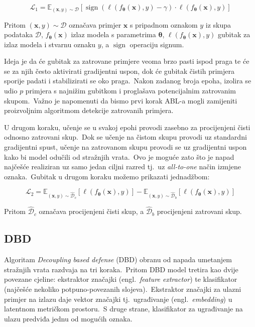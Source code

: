 \documentclass[diplomskirad]{fer}
\begin{document}
\begin{equation}
  \mathcal{L}_1 = \mathbb{E}_{(\bm{x}, y) \sim \mathcal{D}} \left[ \operatorname{sign} \left( \ell(f_{\bm{\theta}}(\bm{x}), y) - \gamma \right) \cdot \ell(f_{\bm{\theta}}(\bm{x}), y) \right]
  \label{eq:abl1}
\end{equation}

Pritom $(\bm{x}, y) \sim \mathcal{D}$ označava primjer $\bm{x}$ s pripadnom oznakom $y$ iz skupa podataka $\mathcal{D}$, $f_{\bm{\theta}}(\bm{x})$ izlaz modela s parametrima $\bm{\theta}$, $\ell(f_{\bm{\theta}}(\bm{x}), y)$ gubitak za izlaz modela i stvarnu oznaku $y$, a $\operatorname{sign}$ operaciju signum.\ 
  
Ideja je da će gubitak za zatrovane primjere veoma brzo pasti ispod praga te će se za njih često aktivirati gradijentni uspon, dok će gubitak čistih primjera sporije padati i stabilizirati se oko praga.\ 
Nakon zadanog broja epoha, izolira se udio $p$ primjera s najnižim gubitkom i proglašava potencijalnim zatrovanim skupom.\ Važno je napomenuti da bismo prvi korak ABL-a mogli zamijeniti proizvoljnim algoritmom detekcije zatrovanih primjera.\ 
  
U drugom koraku, učenje se u svakoj epohi provodi zasebno za procijenjeni čisti odnosno zatrovani skup.\ 
Dok se učenje na čistom skupu provodi uz standardni gradijentni spust, učenje na zatrovanom skupu provodi se uz gradijentni uspon kako bi model odučili od stražnjih vrata.\ 
Ovo je moguće zato što je napad najčešće realiziran uz samo jedan ciljni razred tj.\ uz \textit{all-to-one} način izmjene oznaka.\ Gubitak u drugom koraku možemo prikazati jednadžbom:

\begin{equation}
  \mathcal{L}_2 = \mathbb{E}_{(\bm{x}, y) \sim \hat{\mathcal{D}}_c} \left[ \ell(f_{\bm{\theta}}(\bm{x}), y) \right] - \mathbb{E}_{(\bm{x}, y) \sim \hat{\mathcal{D}}_b} \left[ \ell(f_{\bm{\theta}}(\bm{x}), y) \right]
  \label{eq:abl2}
\end{equation}

Pritom $\hat{\mathcal{D}}_c$ označava procijenjeni čisti skup, a $\hat{\mathcal{D}}_b$ procijenjeni zatrovani skup.\

\subsection{DBD}
\label{sub:dbd}

Algoritam \textit{Decoupling based defense} (DBD) obranu od napada umetanjem stražnjih vrata razdvaja na tri koraka.\ 
Pritom DBD model tretira kao dvije povezane cjeline: ekstraktor značajki (engl.\ \textit{feature extractor}) te klasifikator (najčešće nekoliko potpuno-povezanih slojeva).\  
Ekstraktor značajki za ulazni primjer na izlazu daje vektor značajki tj.\ ugrađivanje (engl.\ \textit{embedding}) u latentnom metričkom prostoru.\ 
S druge strane, klasifikator za ugrađivanje na ulazu predviđa jednu od mogućih oznaka.\
\end{document}
